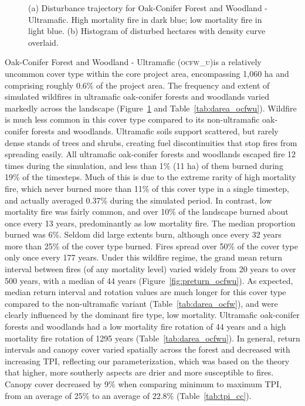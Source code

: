 \begin{figure}[!htbp]
  \centering
  \caption{\small (a) Disturbance trajectory for Oak-Conifer Forest and Woodland - Ultramafic. High mortality fire in dark blue; low mortality fire in light blue. (b) Histogram of disturbed hectares with density curve overlaid.} 
  \label{fig:darea_ocfwu}
\end{figure}

Oak-Conifer Forest and Woodland - Ultramafic (\textsc{ocfw\_u})is a relatively uncommon cover type within the core project area, encompassing 1,060 ha and comprising roughly 0.6\% of the project area. The frequency and extent of simulated wildfires in ultramafic oak-conifer forests and woodlands varied markedly across the landscape (Figure~\ref{fig:darea_ocfwu} and Table~\ref{tab:darea_ocfwu}). %
%
Wildfire is much less common in this cover type compared to its non-ultramafic oak-conifer forests and woodlands. Ultramafic soils support scattered, but rarely dense stands of trees and shrubs, creating fuel discontinuities that stop fires from spreading easily. All ultramafic oak-conifer forests and woodlands escaped fire 12 times during the simulation, and less than 1\% (11 ha) of them burned during 19\% of the timesteps. Much of this is due to the extreme rarity of high mortality fire, which never burned more than 11\% of this cover type in a single timestep, and actually averaged 0.37\% during the simulated period. In contrast, low mortality fire was fairly common, and over 10\% of the landscape burned about once every 13 years, predominantly as low mortality fire. The median proportion burned was 6\%. Seldom did large extents burn, although once every 32 years more than 25\% of the cover type burned. Fires spread over 50\% of the cover type only once every 177 years.  %
%
Under this wildfire regime, the grand mean return interval between fires (of any mortality level) varied widely from 20 years to over 500 years, with a median of 44 years (Figure~\ref{fig:preturn_ocfwu}). As expected, median return interval and rotation values are much longer for this cover type compared to the non-ultramafic variant (Table~\ref{tab:darea_ocfw}), and were clearly influenced by the dominant fire type, low mortality. Ultramafic oak-conifer forests and woodlands had a low mortality fire rotation of 44 years and a high mortality fire rotation of 1295 years (Table~\ref{tab:darea_ocfwu}).  %
%
In general, return intervals and canopy cover varied spatially across the forest and decreased with increasing TPI, reflecting our parameterization, which was based on the theory that higher, more southerly aspects are drier and more susceptible to fires. Canopy cover decreased by 9\% when comparing minimum to maximum TPI, from an average of 25\% to an average of 22.8\% (Table~\ref{tab:tpi_cc}). %

